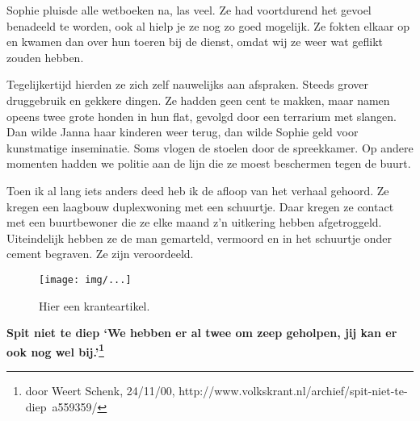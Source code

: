 \documentclass[10pt,twoside,openright]{memoir}
\begin{document}
Sophie pluisde alle wetboeken na, las veel. Ze had voortdurend het gevoel benadeeld te worden, ook al hielp je ze nog zo goed mogelijk. Ze fokten elkaar op en kwamen dan over hun toeren bij de dienst, omdat wij ze weer wat geflikt zouden hebben. 

Tegelijkertijd hierden ze zich zelf nauwelijks aan afspraken. Steeds grover druggebruik en gekkere dingen. Ze hadden geen cent te makken, maar namen opeens twee grote honden in hun flat, gevolgd door een terrarium met slangen. Dan wilde Janna haar kinderen weer terug, dan wilde Sophie geld voor kunstmatige inseminatie. Soms vlogen de stoelen door de spreekkamer. Op andere momenten hadden we politie aan de lijn die ze moest beschermen tegen de buurt. 

Toen ik al lang iets anders deed heb ik de afloop van het verhaal gehoord. Ze kregen een laagbouw duplexwoning met een schuurtje. Daar kregen ze contact met een buurtbewoner die ze elke maand z'n uitkering hebben afgetroggeld. Uiteindelijk hebben ze de man gemarteld, vermoord en in het schuurtje onder cement begraven. Ze zijn veroordeeld. 

\begin{figure}[t]
\texttt{[image: img/...]}
\caption{Hier een kranteartikel.}
\end{figure}

\textbf{Spit niet te diep
`We hebben er al twee om zeep geholpen, jij kan er ook nog wel bij.'\footnote{door Weert Schenk, 24/11/00, http://www.volkskrant.nl/archief/spit-niet-te-diep~a559359/}}



\end{document}
